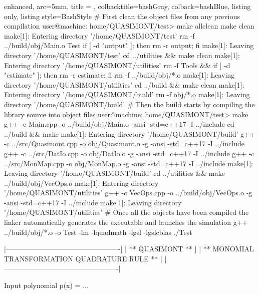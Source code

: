 \documentclass[a4paper, twosided]{book}
\begin{document}
\vspace{0.5cm}
\begin{tcblisting}{enhanced,
                   arc=5mm,
                   title = \color{black}{\large \ttfamily Compilation and Linking of the library},
                   colbacktitle=bashGray,
                   colback=bashBlue,
                   listing only,
                   listing style=BashStyle}
# First clean the object files from any previous compilation
user@machine: home/QUASIMONT/test> make allclean
make clean
make[1]: Entering directory '/home/QUASIMONT/test'
rm -f ../build/obj/Main.o Test
if [ -d "output" ]; then rm -r output; fi 
make[1]: Leaving directory '/home/QUASIMONT/test'
cd ../utilities && make clean
make[1]: Entering directory '/home/QUASIMONT/utilities'
rm -f Tools && if [ -d "estimate" ]; then rm -r estimate; fi
rm -f ../build/obj/*.o
make[1]: Leaving directory '/home/QUASIMONT/utilities'
cd ../build && make clean
make[1]: Entering directory '/home/QUASIMONT/build'
rm -f obj/*.o
make[1]: Leaving directory '/home/QUASIMONT/build'
# Then the build starts by compiling the library source into object files
user@machine: home/QUASIMONT/test> make
g++ -c Main.cpp -o ../build/obj/Main.o -ansi -std=c++17 -I ../include
cd ../build && make
make[1]: Entering directory '/home/QUASIMONT/build'
g++ -c ../src/Quasimont.cpp -o obj/Quasimont.o -g -ansi -std=c++17 -I ../include 
g++ -c ../src/DatIo.cpp -o obj/DatIo.o -g -ansi -std=c++17 -I ../include 
g++ -c ../src/MonMap.cpp -o obj/MonMap.o -g -ansi -std=c++17 -I ../include 
make[1]: Leaving directory '/home/QUASIMONT/build'
cd ../utilities && make ../build/obj/VecOps.o
make[1]: Entering directory '/home/QUASIMONT/utilities'
g++ -c VecOps.cpp -o ../build/obj/VecOps.o -g -ansi -std=c++17 -I ../include 
make[1]: Leaving directory '/home/QUASIMONT/utilities'
# Once all the objects have been compiled the linker automatically generates the executable and launches the simulation
g++ ../build/obj/*.o -o Test -lm -lquadmath -lgsl -lgslcblas
./Test

    |-------------------------------------------------|
    |                 ** QUASIMONT **                 |
    |  ** MONOMIAL TRANSFORMATION QUADRATURE RULE **  |
    |-------------------------------------------------|


 Input polynomial p(x) = ...
\end{tcblisting}
\vspace{0.5cm}
\end{document}
